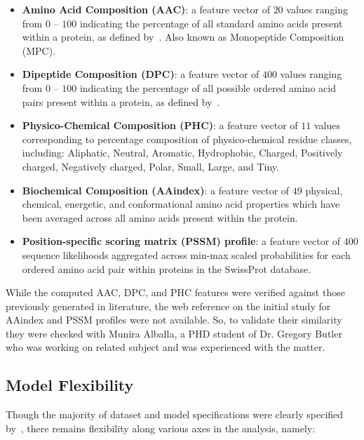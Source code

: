 \begin{itemize}
\item \textbf{Amino Acid Composition (AAC)}: a feature vector of $20$ values ranging from $0$ -- $100$ indicating the
percentage of all standard amino acids present within a protein, as defined by~\cite{gromiha2010protein}. Also known
as Monopeptide Composition (MPC).
\item \textbf{Dipeptide Composition (DPC)}: a feature vector of $400$ values ranging from $0$ -- $100$ indicating the
percentage of all possible ordered amino acid pairs present within a protein, as defined by~\cite{gromiha2010protein}.
\item \textbf{Physico-Chemical Composition (PHC)}: a feature vector of $11$ values corresponding
to percentage composition of physico-chemical residue classes, including: Aliphatic, Neutral, Aromatic, Hydrophobic, Charged, Positively charged,
Negatively charged, Polar, Small, Large, and Tiny. 
\item \textbf{Biochemical Composition (AAindex)}: a feature vector of $49$ physical, chemical, energetic, and
conformational amino acid properties which have been averaged across all amino acids present within the protein.
\item \textbf{Position-specific scoring matrix (PSSM) profile}: a feature vector of $400$ sequence
likelihoods aggregated across min-max scaled probabilities for each ordered amino acid pair within
proteins in the SwissProt database.
\end{itemize}

While the computed AAC, DPC, and PHC features were verified against those previously generated in literature, the 
web reference on the initial study for AAindex and PSSM profiles were not available. So, to validate their similarity 
they were checked with Munira Alballa, a PHD student of Dr. Gregory Butler who was working on related subject \cite{alballa2020trancep}
and was experienced with the matter.
\subsection{Model Flexibility}
\label{sec:modelflex}
Though the majority of dataset and model specifications were clearly specified by~\cite{mishra2014prediction}, there
remains flexibility along various axes in the analysis, namely:

